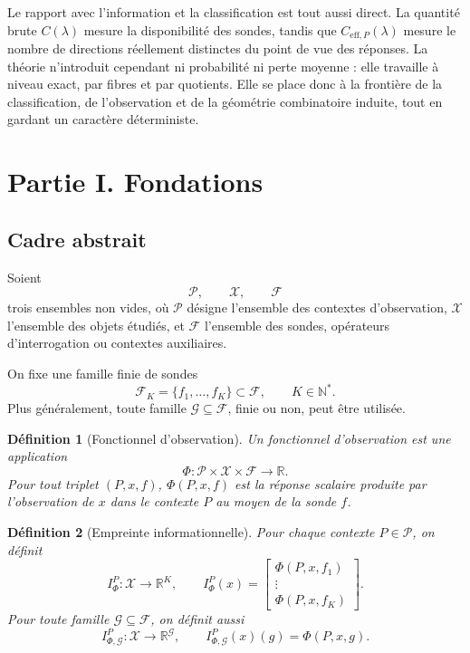 \documentclass[11pt,a4paper]{article}
\newtheorem{definition}{Définition}
\begin{document}
Le rapport avec l'information et la classification est tout aussi direct. La quantité brute \(C(\lambda)\) mesure la disponibilité des sondes, tandis que \(C_{\mathrm{eff},P}(\lambda)\) mesure le nombre de directions réellement distinctes du point de vue des réponses. La théorie n'introduit cependant ni probabilité ni perte moyenne : elle travaille à niveau exact, par fibres et par quotients. Elle se place donc à la frontière de la classification, de l'observation et de la géométrie combinatoire induite, tout en gardant un caractère déterministe.

\section{Partie I. Fondations}

\subsection{Cadre abstrait}

Soient
\[
\mathcal P,\qquad \mathcal X,\qquad \mathcal F
\]
trois ensembles non vides, où \(\mathcal P\) désigne l'ensemble des contextes d'observation, \(\mathcal X\) l'ensemble des objets étudiés, et \(\mathcal F\) l'ensemble des sondes, opérateurs d'interrogation ou contextes auxiliaires.

On fixe une famille finie de sondes
\[
\mathcal F_K=\{f_1,\ldots,f_K\}\subset \mathcal F,
\qquad K\in\mathbb N^*.
\]
Plus généralement, toute famille \(\mathcal G\subseteq\mathcal F\), finie ou non, peut être utilisée.

\begin{definition}[Fonctionnel d'observation]
Un \emph{fonctionnel d'observation} est une application
\[
\Phi:\mathcal P\times\mathcal X\times\mathcal F\longrightarrow \mathbb R.
\]
Pour tout triplet \((P,x,f)\), \(\Phi(P,x,f)\) est la réponse scalaire produite par l'observation de \(x\) dans le contexte \(P\) au moyen de la sonde \(f\).
\end{definition}

\begin{definition}[Empreinte informationnelle]
Pour chaque contexte \(P\in\mathcal P\), on définit
\[
I_\Phi^P:\mathcal X\longrightarrow \mathbb R^K,
\qquad
I_\Phi^P(x)=
\begin{bmatrix}
\Phi(P,x,f_1)\\
\vdots\\
\Phi(P,x,f_K)
\end{bmatrix}.
\]
Pour toute famille \(\mathcal G\subseteq\mathcal F\), on définit aussi
\[
I_{\Phi,\mathcal G}^P:\mathcal X\longrightarrow \mathbb R^{\mathcal G},
\qquad
I_{\Phi,\mathcal G}^P(x)(g)=\Phi(P,x,g).
\]
\end{definition}
\end{document}
